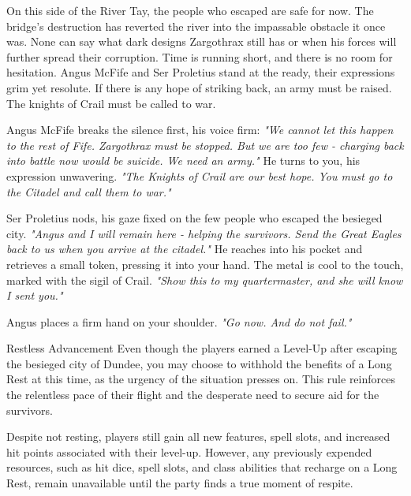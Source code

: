 	{}%
	{}%
	{}%
	{}%
	{}%
	{}%
	{}%
	{}%
	

{\entryfont On this side of the River Tay, the people who escaped are safe for now. The bridge's destruction has reverted the river into the impassable obstacle it once was. None can say what dark designs Zargothrax still has or when his forces will further spread their corruption. Time is running short, and there is no room for hesitation. Angus McFife and Ser Proletius stand at the ready, their expressions grim yet resolute. If there is any hope of striking back, an army must be raised. The knights of Crail must be called to war.}

\begin{DndReadAloud}
	Angus McFife breaks the silence first, his voice firm: \textit{"We cannot let this happen to the rest of Fife. Zargothrax must be stopped. But we are too few - charging back into battle now would be suicide. We need an army."} He turns to you, his expression unwavering. \textit{"The Knights of Crail are our best hope. You must go to the Citadel and call them to war."}

Ser Proletius nods, his gaze fixed on the few people who escaped the besieged city. \textit{"Angus and I will remain here - helping the survivors. Send the Great Eagles back to us when you arrive at the citadel."} He reaches into his pocket and retrieves a small token, pressing it into your hand. The metal is cool to the touch, marked with the sigil of Crail. \textit{"Show this to my quartermaster, and she will know I sent you."}

	Angus places a firm hand on your shoulder. \textit{"Go now. And do not fail."}
\end{DndReadAloud}

\begin{DndOptionalRule}{Restless Advancement}\label{or:RestlessAdvancement}%
	Even though the players earned a Level-Up after escaping the besieged city of Dundee, you may choose to withhold the benefits of a Long Rest at this time, as the urgency of the situation presses on. This rule reinforces the relentless pace of their flight and the desperate need to secure aid for the survivors.

	Despite not resting, players still gain all new features, spell slots, and increased hit points associated with their level-up. However, any previously expended resources, such as hit dice, spell slots, and class abilities that recharge on a Long Rest, remain unavailable until the party finds a true moment of respite.
\end{DndOptionalRule}

